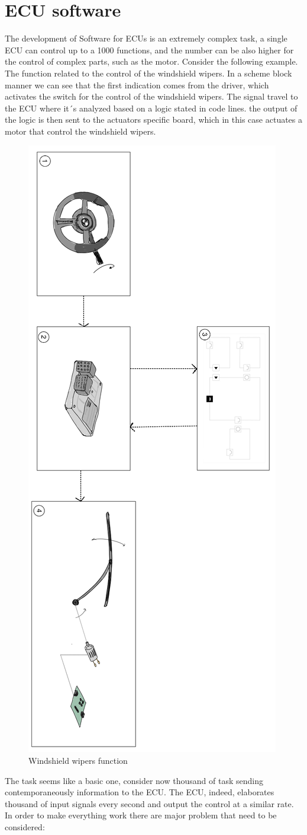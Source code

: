 \documentclass[../main.tex]{subfiles}
\begin{document}
\section{ECU software}
The development of Software for ECUs is an extremely complex task, a single ECU can control up to a 1000 functions, and the number can be also higher for the control of complex parts, such as the motor.
Consider the following example. The function related to the control of the windshield wipers. In a scheme block manner we can see that the first indication comes from the driver, which activates the switch for the control of the windshield wipers. The signal travel to the ECU where it´s analyzed based on a logic stated in code lines. the output of the logic is then sent to the actuators specific board, which in this case actuates a motor that control the windshield wipers.\\
\begin{figure}[H]
    \centering
    \includegraphics[width=0.45\linewidth, angle = 90]{images_folder/windshieldwipersfunction.jpeg}
    \caption{Windshield wipers function}
    \label{fig:WWFunct}
\end{figure}
The task seems like a basic one, consider now thousand of task sending contemporaneously information to the ECU. The ECU, indeed,  elaborates thousand of input signals every second and output the control at a similar rate. In order to make everything work there are major problem that need to be considered:
\end{document}
